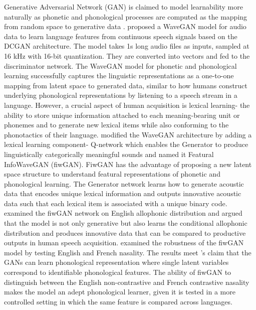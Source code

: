 \documentclass{Interspeech2024}
\begin{document}
Generative Adversarial Network (GAN) is claimed to model learnability more naturally as phonetic and phonological processes are computed as the mapping from random space to generative data \cite{goodfellow_generative_2014,begus_generative_2020}. \cite{donahue_adversarial_2018} proposed a WaveGAN model for audio data to learn language features from continuous speech signals based on the DCGAN architecture\cite{radford_unsupervised_2015}. The model takes 1s long audio files as inputs, sampled at 16 kHz with 16-bit quantization. They are converted into vectors and fed to the discriminator network. The WaveGAN model for phonetic and phonological learning \cite{begus_generative_2020} successfully captures the linguistic representations as a one-to-one mapping from latent space to generated data, similar to how humans construct underlying phonological representations by listening to a speech stream in a language. However, a crucial aspect of human acquisition is lexical learning- the ability to store unique information attached to each meaning-bearing unit or phonemes and to generate new lexical items while also conforming to the phonotactics of their language. \cite{begus_ciwgan_2021} modified the WaveGAN architecture by adding a lexical learning component- Q-network \cite{chen_infogan_2016} which enables the Generator to produce linguistically categorically meaningful sounds and named it Featural InfoWaveGAN (fiwGAN)\cite{begus_ciwgan_2021}. FiwGAN has the advantage of proposing a new latent space structure to understand featural representations of phonetic and phonological learning. The Generator network learns how to generate acoustic data that encodes unique lexical information and outputs innovative acoustic data such that each lexical item is associated with a unique binary code. \cite{begus_interpreting_2022} examined the fiwGAN network on English allophonic distribution and argued that the model is not only generative but also learns the conditional allophonic distribution and produces innovative data that can be compared to productive outputs in human speech acquisition. %
\cite{chen_exploring_2023} examined the robustness of the fiwGAN model by testing English and French nasality. The results meet \cite{begus_generative_2020}'s claim that the GANs can learn phonological representation where single latent variables correspond to identifiable phonological features. The ability of fiwGAN to distinguish between the English non-contrastive and French contrastive nasality makes the model an adept phonological learner, given it is tested in a more controlled setting in which the same feature is compared across languages. 
\end{document}
